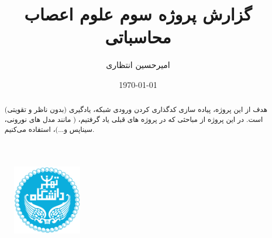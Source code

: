 \documentclass{report}
\title{گزارش پروژه سوم علوم اعصاب محاسباتی}
\author{امیرحسین انتظاری}
\date{\today}
\begin{document}
\begin{figure}
    \centering \includegraphics[height=3cm]{images/Logo.png}
\end{figure}
\maketitle
\newpage
\tableofcontents

\newpage
\maketitle
\newpage
\tableofcontents

    \begin{abstract}
        هدف از این پروژه، پیاده سازی کدگذاری کردن ورودی شبکه، یادگیری
        (بدون ناظر و تقویتی) 
        است. در این پروژه از مباحثی که در پروژه های قبلی یاد گرفتیم،
        ( مانند مدل های نورونی، سیناپس و...)، 
        استفاده می‌کنیم.
    \end{abstract}
\restoregeometry


\newpage

\newpage



\end{document}
